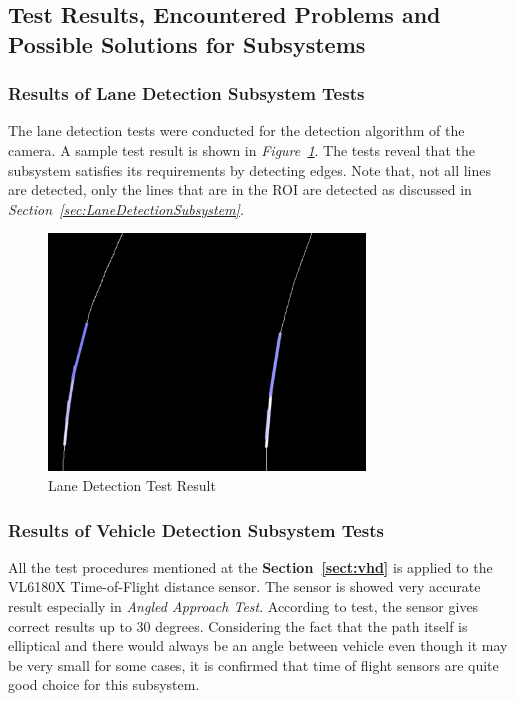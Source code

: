 \documentclass[a4paper,12pt]{article}
\begin{document}
	\subsection{Test Results, Encountered Problems and Possible Solutions for Subsystems}	
	
	\subsubsection*{Results of Lane Detection Subsystem Tests}
		
	The lane detection tests were conducted for the detection algorithm of the camera. A sample test result is shown in \textit{Figure~\ref{fig:laneD_test}}. The tests reveal that the subsystem satisfies its requirements by detecting edges. Note that, not all lines are detected, only the lines that are in the ROI are detected as discussed in \textit{Section~\ref{sec:LaneDetectionSubsystem}}.
	
				\begin{figure}[h]
		\includegraphics[width=0.75\textwidth,center]{images/laneD_test}
		\caption{Lane Detection Test Result \label{fig:laneD_test} }
	\end{figure}
		
	
	
	\subsubsection*{Results of Vehicle Detection Subsystem Tests}


		All the test procedures mentioned at the \textbf{Section~\ref{sect:vhd}} is applied to the VL6180X Time-of-Flight distance sensor. The sensor is showed very accurate result especially in \textit{Angled Approach Test}. According to test, the sensor gives correct results up to 30 degrees. Considering the fact that the path itself is elliptical and there would always be an angle between vehicle even though it may be very small for some cases, it is confirmed that time of flight sensors are quite good choice for this subsystem.
\end{document}
